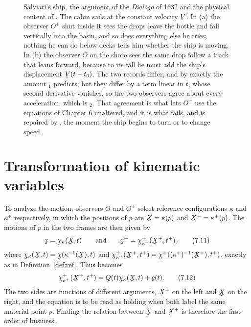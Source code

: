 \begin{figure}[htbp]
\caption{Salviati's ship, the argument of the \emph{Dialogo} of 1632 and
the physical content of . The cabin sails at the constant
velocity $\bV$. In (a) the observer $O^{+}$ shut inside it sees the drops
leave the bottle and fall vertically into the basin, and so does
everything else he tries; nothing he can do below decks tells him whether
the ship is moving. In (b) the observer $O$ on the shore sees the same
drop follow a track that leans forward, because to its fall he must add
the ship's displacement $\bV(t-t_{0})$. The two records differ, and by
exactly the amount $_{1}$ predicts; but they differ by a term
linear in $t$, whose second derivative vanishes, so the two observers
agree about every acceleration, which is $_{2}$. That agreement
is what lets $O^{+}$ use the equations of Chapter 6 unaltered, and it is
what fails, and is repaired by , the moment the ship begins to
turn or to change speed.}
\label{fig:ch7ship}
\end{figure}
\section{Transformation of kinematic variables}\label{sec:ch7kin}

To analyze the motion, observers $O$ and $O^{+}$ select reference
configurations $\kappa$ and $\kappa^{+}$ respectively, in which the
positions of $p$ are $\bX=\kappa(p)$ and $\bX^{+}=\kappa^{+}(p)$. The
motions of $p$ in the two frames are then given by
\begin{equation}
   \bx=\bchi_{\kappa}(\bX,t)
   \qquad\text{and}\qquad
   \bx^{+}=\bchi^{+}_{\kappa^{+}}(\bX^{+},t^{+}),
   \tag{7.11}\label{eq:7.11}
\end{equation}
where $\bchi_{\kappa}(\bX,t)=\bchi(\kappa^{-1}(\bX),t)$ and
$\bchi^{+}_{\kappa^{+}}(\bX^{+},t^{+})
=\bchi^{+}((\kappa^{+})^{-1}(\bX^{+}),t^{+})$, exactly as in
Definition~\ref{def:ref}. Thus  becomes
\begin{equation}
   \bchi^{+}_{\kappa^{+}}(\bX^{+},t^{+})=\bQ(t)\bchi_{\kappa}(\bX,t)
   +\bc(t).
   \tag{7.12}\label{eq:7.12}
\end{equation}
The two sides are functions of different arguments, $\bX^{+}$ on the left
and $\bX$ on the right, and the equation is to be read as holding when
both label the same material point $p$. Finding the relation between
$\bX$ and $\bX^{+}$ is therefore the first order of business.

